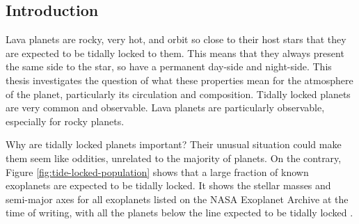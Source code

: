 \begin{SingleSpace}
\chapter{Introduction}
\vspace{0.5cm}
\end{SingleSpace}
\vspace{0.5cm}

Lava planets are rocky, very hot, and orbit so close to their host stars that they are expected to be tidally locked to them. This means that they always present the same side to the star, so have a permanent day-side and night-side. This thesis investigates the question of what these properties mean for the atmosphere of the planet, particularly its circulation and composition. Tidally locked planets are very common and observable. Lava planets are particularly observable, especially for rocky planets.

Why are tidally locked planets important? Their unusual situation could  make them seem like oddities, unrelated to the majority of planets. On the contrary, Figure \ref{fig:tide-locked-population} shows that a large fraction of known exoplanets are expected to be tidally locked. It shows the stellar masses and semi-major axes for all exoplanets listed on the NASA Exoplanet Archive at the time of writing, with all the planets below the line expected to be tidally locked \citep{pierrehumbert2018review}.

